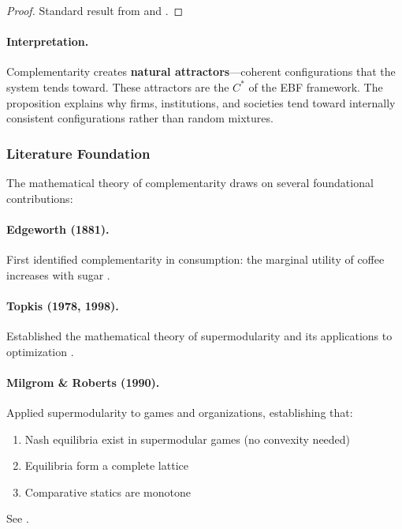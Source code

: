 \begin{proof}
Standard result from \citet{topkis1998} and \citet{milgromroberts1990rationalizability}.
\end{proof}

\paragraph{Interpretation.}
Complementarity creates \textbf{natural attractors}---coherent configurations
that the system tends toward. These attractors are the $C^*$ of the EBF framework.
The proposition explains why firms, institutions, and societies tend toward
internally consistent configurations rather than random mixtures.

\subsubsection{Literature Foundation}

The mathematical theory of complementarity draws on several foundational
contributions:

\paragraph{Edgeworth (1881).}
First identified complementarity in consumption: the marginal utility of 
coffee increases with sugar \citep{edgeworth1881}.

\paragraph{Topkis (1978, 1998).}
Established the mathematical theory of supermodularity and its applications 
to optimization \citep{topkis1978, topkis1998}.

\paragraph{Milgrom \& Roberts (1990).}
Applied supermodularity to games and organizations, establishing that:
\begin{enumerate}
    \item Nash equilibria exist in supermodular games (no convexity needed)
    \item Equilibria form a complete lattice
    \item Comparative statics are monotone
\end{enumerate}
See \citet{milgromroberts1990compare, milgromroberts1990rationalizability}.

